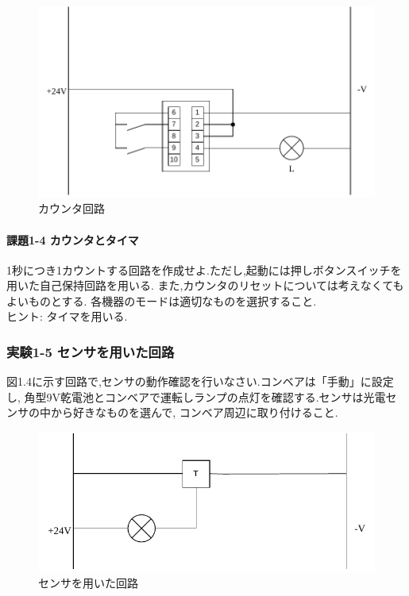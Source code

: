 \begin{figure}[H]
  \centering
  \includegraphics[scale=0.5]{sozai/3.pdf}
  \caption{カウンタ回路}
\end{figure}

\paragraph{課題1-4 カウンタとタイマ}
1秒につき1カウントする回路を作成せよ.ただし,起動には押しボタンスイッチを用いた自己保持回路を用いる.
また,カウンタのリセットについては考えなくてもよいものとする.
各機器のモードは適切なものを選択すること.\\
ヒント: タイマを用いる.

\subsubsection{実験1-5 センサを用いた回路}
図1.4に示す回路で,センサの動作確認を行いなさい.コンベアは「手動」に設定し,
角型9V乾電池とコンベアで運転しランプの点灯を確認する.センサは光電センサの中から好きなものを選んで,
コンベア周辺に取り付けること.

\begin{figure}[H]
  \centering
  \includegraphics[scale=0.5]{sozai/4.pdf}
  \caption{センサを用いた回路}
\end{figure}

